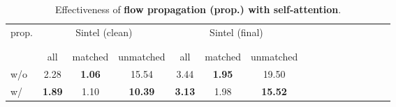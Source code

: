 \documentclass[10pt,twocolumn,letterpaper]{article}
\begin{document}
\begin{table}[t]
    \centering
    \setlength{\tabcolsep}{1.5pt} %
    \begin{tabular}{lccccccccccccccc}
    \toprule
    
    \multirow{2}{*}[-2pt]{prop.} & \multicolumn{3}{c}{Sintel (clean)}  &  \multicolumn{3}{c}{Sintel (final)} \\
    \addlinespace[-12pt] \\
    \cmidrule(lr){2-4} \cmidrule(lr){5-7} 
    \addlinespace[-12pt] \\
    & all & matched & unmatched & all & matched & unmatched  \\
    \midrule
    
    w/o  & 2.28 & \textbf{1.06} & 15.54 & 3.44 & \textbf{1.95} & 19.50  \\
    w/  & \textbf{1.89} & 1.10 & \textbf{10.39} & \textbf{3.13} & 1.98 & \textbf{15.52} \\
    

    \bottomrule
    \end{tabular}
    \vspace{-5pt}
    \caption{Effectiveness of \textbf{flow propagation (prop.) with self-attention}. 
    }
    \label{tab:prop}
    \vspace{-6pt}
    
    
\end{table}
\end{document}
